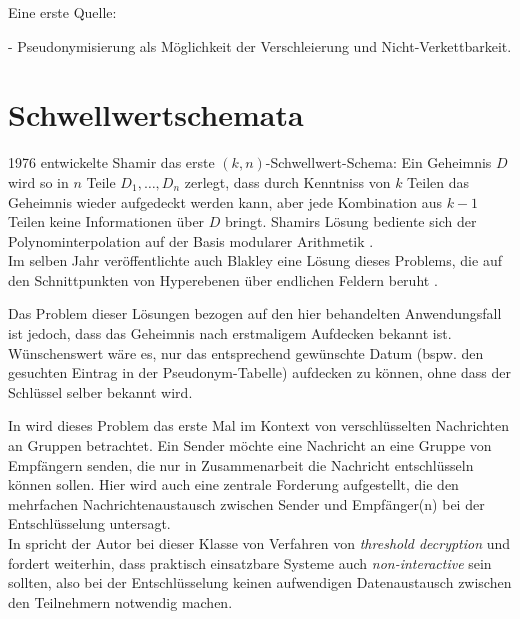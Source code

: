 \documentclass[
    fontsize=12pt,
    headings=small,
    parskip=half,           %
    bibliography=totoc,
    numbers=noenddot,       %
    open=any,               %
    ]{scrreprt}
\begin{document}
\label{sec_pseudonym}

Eine erste Quelle: \cite{pfitzmann2001, pfitzmann2010}

- Pseudonymisierung als Möglichkeit der Verschleierung und Nicht-Verkettbarkeit.

\section{Schwellwertschemata}

\label{sec_threshold}






1976 entwickelte Shamir das erste \((k,n)\)-Schwellwert-Schema: Ein Geheimnis \(D\) wird so in \(n\) Teile \(D_1, \dots, D_n\) zerlegt, dass durch Kenntniss von \(k\) Teilen das Geheimnis wieder aufgedeckt werden kann, aber jede Kombination aus \(k-1\) Teilen keine Informationen über \(D\) bringt. Shamirs Lösung bediente sich der Polynominterpolation auf der Basis modularer Arithmetik \cite{shamir1979}.\\
Im selben Jahr veröffentlichte auch Blakley eine Lösung dieses Problems, die auf den Schnittpunkten von Hyperebenen über endlichen Feldern beruht \cite{blakley1979}.

Das Problem dieser Lösungen bezogen auf den hier behandelten Anwendungsfall ist jedoch, dass das Geheimnis nach erstmaligem Aufdecken bekannt ist. Wünschenswert wäre es, nur das entsprechend gewünschte Datum (bspw. den gesuchten Eintrag in der Pseudonym-Tabelle) aufdecken zu können, ohne dass der Schlüssel selber bekannt wird. 


In \cite{desmedt1987} wird dieses Problem das erste Mal im Kontext von verschlüsselten Nachrichten an Gruppen betrachtet. Ein Sender möchte eine Nachricht an eine Gruppe von Empfängern senden, die nur in Zusammenarbeit die Nachricht entschlüsseln können sollen. Hier wird auch eine zentrale Forderung aufgestellt, die den mehrfachen Nachrichtenaustausch zwischen Sender und Empfänger(n) bei der Entschlüsselung untersagt. \\
In \cite{desmedt1993} spricht der Autor bei dieser Klasse von Verfahren von \textit{threshold decryption} und fordert weiterhin, dass praktisch einsatzbare Systeme auch \textit{non-interactive} sein sollten, also bei der Entschlüsselung keinen aufwendigen Datenaustausch zwischen den Teilnehmern notwendig machen.
\end{document}
